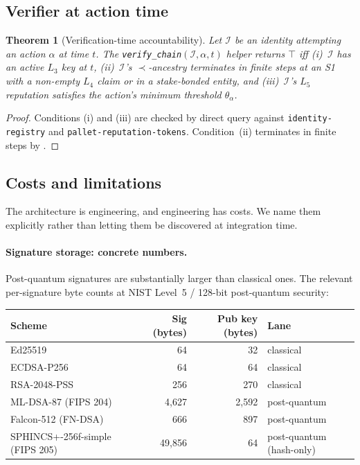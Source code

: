 \documentclass[11pt,a4paper,parskip=half-,DIV=12,headings=standardclasses]{scrartcl}
\theoremstyle{ncthm}
\newtheorem{theorem}{Theorem}[section]
\theoremstyle{ncdef}
\newcommand{\identity}{\mathcal{I}}
\begin{document}
\subsection{Verifier at action time}

\begin{theorem}[Verification-time accountability]\label{thm:verify-action-time}
Let $\identity$ be an identity attempting an action $\alpha$ at time
$t$. The \texttt{verify\_chain}$(\identity, \alpha, t)$ helper returns
$\top$ iff (i)~$\identity$ has an active $L_3$ key at $t$, (ii)~$\identity$'s
$\prec$-ancestry terminates in finite steps at an S1 with a non-empty
$L_4$ claim or in a stake-bonded entity, and (iii)~$\identity$'s
$L_5$ reputation satisfies the action's minimum threshold $\theta_\alpha$.
\end{theorem}

\begin{proof}
Conditions (i) and (iii) are checked by direct query against
\texttt{identity-registry} and \texttt{pallet-reputation-tokens}.
Condition~(ii) terminates in finite steps by
.
\end{proof}

\subsection{Costs and limitations}\label{subsec:costs}

The architecture is engineering, and engineering has costs. We name
them explicitly rather than letting them be discovered at integration
time.

\paragraph{Signature storage: concrete numbers.} Post-quantum
signatures are substantially larger than classical ones. The
relevant per-signature byte counts at NIST Level~5 / 128-bit
post-quantum security:

\begin{center}
\small
\begin{tabular}{@{}lrrl@{}}
\toprule
\textsf{Scheme} & \textsf{Sig (bytes)} & \textsf{Pub key (bytes)} & \textsf{Lane}\\
\midrule
Ed25519             &   64  &  32  & classical\\
ECDSA-P256          &   64  &  64  & classical\\
RSA-2048-PSS        &  256  & 270  & classical\\
ML-DSA-87 (FIPS 204) & 4{,}627  & 2{,}592 & post-quantum\\
Falcon-512  (FN-DSA)  &  666  &  897 & post-quantum\\
SPHINCS+-256f-simple (FIPS 205) & 49{,}856 & 64 & post-quantum (hash-only)\\
\bottomrule
\end{tabular}
\end{center}
\end{document}
